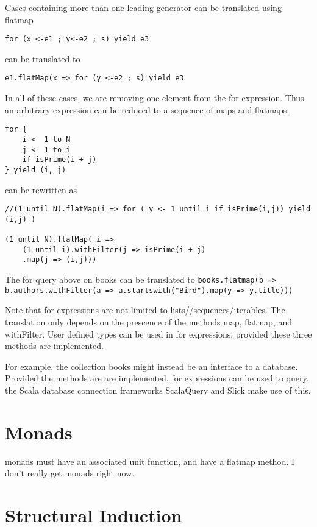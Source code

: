 Cases containing more than one leading generator can be translated using flatmap
\begin{lstlisting}
for (x <-e1 ; y<-e2 ; s) yield e3
\end{lstlisting}
can be translated to 
\begin{lstlisting}
e1.flatMap(x => for (y <-e2 ; s) yield e3
\end{lstlisting}

In all of these cases, we are removing one element from the for expression. Thus an arbitrary expression can be reduced to a sequence of maps and flatmaps.

\begin{lstlisting}
for { 
	i <- 1 to N
	j <- 1 to i
	if isPrime(i + j)
} yield (i, j)
\end{lstlisting}

can be rewritten as
\begin{lstlisting}
//(1 until N).flatMap(i => for ( y <- 1 until i if isPrime(i,j)) yield (i,j) )

(1 until N).flatMap( i => 
	(1 until i).withFilter(j => isPrime(i + j)
	.map(j => (i,j)))
\end{lstlisting}

The for query above on books can be translated to \lstinline|books.flatmap(b => b.authors.withFilter(a => a.startswith("Bird").map(y => y.title)))|

Note that for expressions are not limited to lists//sequences/iterables. The translation only depends on the prescence of the methods map, flatmap, and withFilter. User defined types can be used in for expressions, provided these three methods are implemented.

For example, the collection books might instead be an interface to a database. Provided the methods are are implemented, for expressions can be used to query. the Scala database connection frameworks ScalaQuery and Slick make use of this.



\section{Monads}

monads must have an associated unit function, and have a flatmap method. I don't really get monads right now.

\section{Structural Induction}

